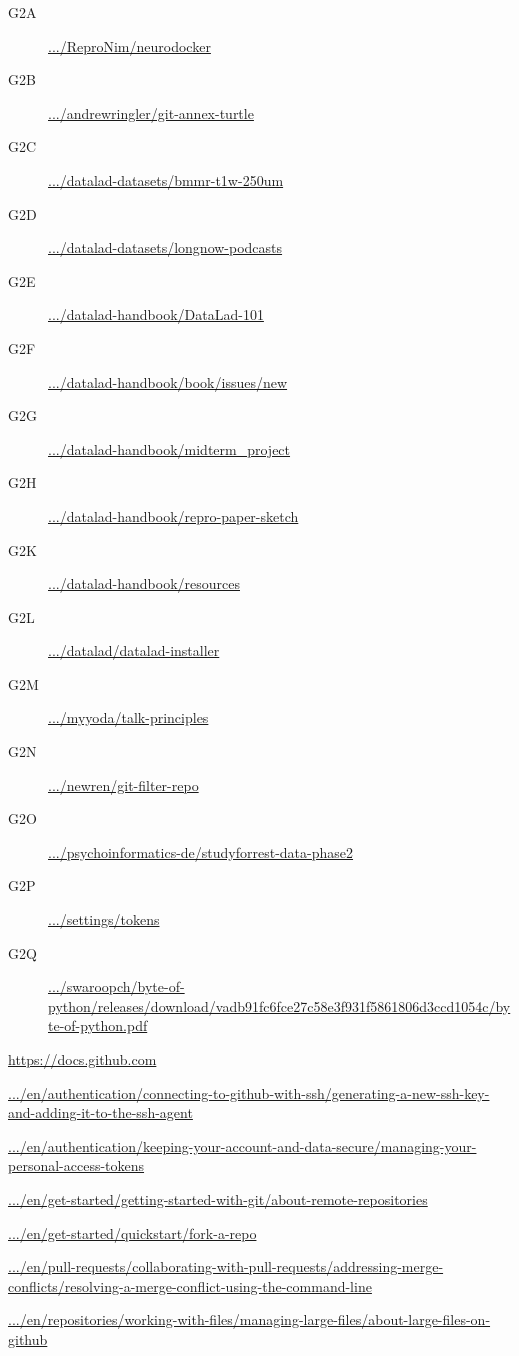 \begin{description}
\vspace{-2mm}
\setlength{\itemindent}{-13mm}
\setlength{\itemsep}{-2mm}
  \item[G2A] \url{.../ReproNim/neurodocker}
  \item[G2B] \url{.../andrewringler/git-annex-turtle}
  \item[G2C] \url{.../datalad-datasets/bmmr-t1w-250um}
  \item[G2D] \url{.../datalad-datasets/longnow-podcasts}
  \item[G2E] \url{.../datalad-handbook/DataLad-101}
  \item[G2F] \url{.../datalad-handbook/book/issues/new}
  \item[G2G] \url{.../datalad-handbook/midterm\_project}
  \item[G2H] \url{.../datalad-handbook/repro-paper-sketch}
  \item[G2K] \url{.../datalad-handbook/resources}
  \item[G2L] \url{.../datalad/datalad-installer}
  \item[G2M] \url{.../myyoda/talk-principles}
  \item[G2N] \url{.../newren/git-filter-repo}
  \item[G2O] \url{.../psychoinformatics-de/studyforrest-data-phase2}
  \item[G2P] \url{.../settings/tokens}
  \item[G2Q] \url{.../swaroopch/byte-of-python/releases/download/vadb91fc6fce27c58e3f931f5861806d3ccd1054c/byte-of-python.pdf}
\end{description}
\item[G3] \url{https://docs.github.com}
\begin{description}
\vspace{-2mm}
\setlength{\itemindent}{-13mm}
\setlength{\itemsep}{-2mm}
  \item[G3A] \url{.../en/authentication/connecting-to-github-with-ssh/generating-a-new-ssh-key-and-adding-it-to-the-ssh-agent}
  \item[G3B] \url{.../en/authentication/keeping-your-account-and-data-secure/managing-your-personal-access-tokens}
  \item[G3C] \url{.../en/get-started/getting-started-with-git/about-remote-repositories}
  \item[G3D] \url{.../en/get-started/quickstart/fork-a-repo}
  \item[G3E] \url{.../en/pull-requests/collaborating-with-pull-requests/addressing-merge-conflicts/resolving-a-merge-conflict-using-the-command-line}
  \item[G3F] \url{.../en/repositories/working-with-files/managing-large-files/about-large-files-on-github}
\end{description}
